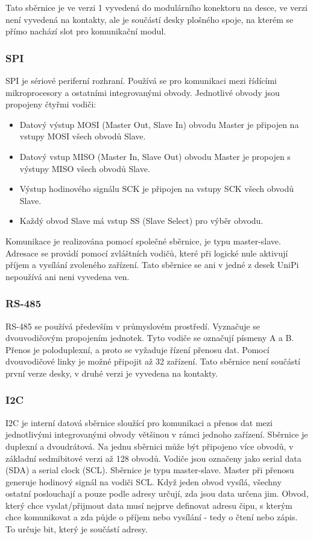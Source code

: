 Tato sběrnice je ve verzi 1 vyvedená do modulárního konektoru na desce, ve verzi není vyvedená na kontakty, ale je součástí desky plošného spoje, na kterém se přímo nachází slot pro komunikační modul.




\subsubsection{SPI}
SPI je sériové periferní rozhraní. Používá se pro komunikaci mezi řídícími mikroprocesory a ostatními integrovanými obvody. Jednotlivé obvody jsou propojeny čtyřmi vodiči:
\begin{itemize}
	\item Datový výstup MOSI (Master Out, Slave In) obvodu Master je připojen na vstupy MOSI všech obvodů Slave.
	\item Datový vstup MISO (Master In, Slave Out) obvodu Master je propojen s výstupy MISO všech obvodů Slave.
	\item Výstup hodinového signálu SCK je připojen na vstupy SCK všech obvodů Slave.
	\item Každý obvod Slave má vstup SS (Slave Select) pro výběr obvodu.
\end{itemize}
Komunikace je realizována pomocí společné sběrnice, je typu master-slave. Adresace se provádí pomocí zvláštních vodičů, které při logické nule aktivují příjem a vysílání zvoleného zařízení. Tato sběrnice se ani v jedné z desek UniPi nepoužívá ani neni vyvedena ven.

\subsubsection{RS-485}
RS-485 se používá především v průmyslovém prostředí. Vyznačuje se dvouvodičovým propojením jednotek. Tyto vodiče se označují písmeny A a B. Přenos je poloduplexní, a proto se vyžaduje řízení přenosu dat. Pomocí dvouvodičové linky je možné připojit až 32 zařízení. Tato sběrnice není součástí první verze desky, v druhé verzi je vyvedena na kontakty.

\subsubsection{I2C}
I2C je interní datová sběrnice sloužící pro komunikaci a přenos dat mezi jednotlivými integrovanými obvody většinou v rámci jednoho zařízení. Sběrnice je duplexní a dvoudrátová. Na jednu sběrnici může být připojeno více obvodů, v základní sedmibitové verzi až 128 obvodů.
Vodiče jsou označeny jako serial data (SDA) a serial clock (SCL). Sběrnice je typu master-slave. Master při přenosu generuje hodinový signál na vodiči SCL. Když jeden obvod vysílá, všechny ostatní poslouchají a pouze podle adresy určují, zda jsou data určena jim. Obvod, který chce vyslat/přijmout data musí nejprve definovat adresu čipu, s kterým chce komunikovat a zda půjde o příjem nebo vysílání - tedy o čtení nebo zápis. To určuje bit, který je součástí adresy. 

